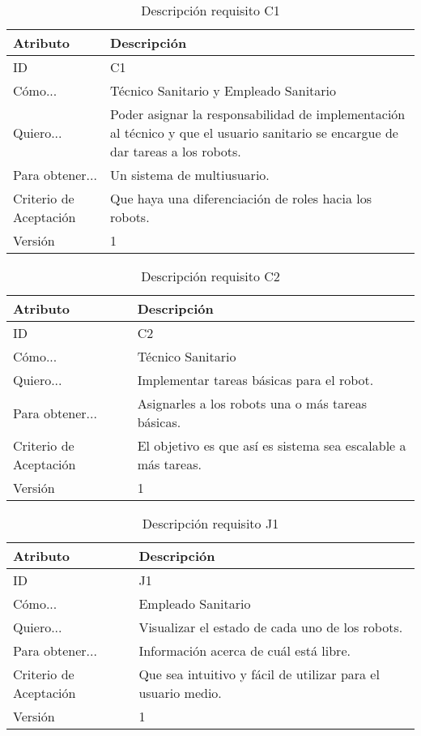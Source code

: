 \begin{table}[H]
    \label{tab:reqC1}
 	\caption{Descripción requisito C1}
	\centering
	
	\begin{tabular}{C{3cm}|C{12cm}}
 		\toprule
 		\textbf{Atributo} & \textbf{Descripción} \\
 		\midrule
 	    ID & C1 \\
 	    Cómo... & Técnico Sanitario y Empleado Sanitario \\
 	    Quiero... & Poder asignar la responsabilidad de implementación al técnico y que el usuario sanitario se encargue de dar tareas a los robots. \\
 	    Para obtener... & Un sistema de multiusuario.  \\
 	    Criterio de Aceptación & Que haya una diferenciación de roles hacia los robots. \\
 	    Versión & 1 \\
 		\bottomrule
 		\end{tabular}
\end{table}

\begin{table}[H]
    \label{tab:reqC2}
 	\caption{Descripción requisito C2}
	\centering
	
	\begin{tabular}{C{3cm}|C{12cm}}
 		\toprule
 		\textbf{Atributo} & \textbf{Descripción} \\
 		\midrule
 	    ID & C2 \\
 	    Cómo... & Técnico Sanitario \\
 	    Quiero... & Implementar tareas básicas para el robot. \\
 	    Para obtener... & Asignarles a los robots una o más tareas básicas.  \\
 	    Criterio de Aceptación & El objetivo es que así es sistema sea escalable a más tareas. \\
 	    Versión & 1 \\
 		\bottomrule
 		\end{tabular}
\end{table}

\begin{table}[H]
    \label{tab:reqJ1}
 	\caption{Descripción requisito J1}
	\centering
	
	\begin{tabular}{C{3cm}|C{12cm}}
 		\toprule
 		\textbf{Atributo} & \textbf{Descripción} \\
 		\midrule
 	    ID & J1 \\
 	    Cómo... & Empleado Sanitario \\
 	    Quiero... & Visualizar el estado de cada uno de los robots. \\
 	    Para obtener... & Información acerca de cuál está libre.  \\
 	    Criterio de Aceptación & Que sea intuitivo y fácil de utilizar para el usuario medio. \\
 	    Versión & 1 \\
 		\bottomrule
 		\end{tabular}
\end{table}

